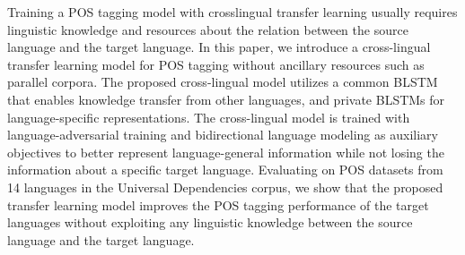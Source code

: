 Training a POS tagging model with crosslingual transfer learning usually requires linguistic knowledge and resources about the relation between the source language and the target language. In this paper, we introduce a cross-lingual transfer learning model for POS tagging without ancillary resources such as parallel corpora. The proposed cross-lingual model utilizes a common BLSTM that enables knowledge transfer from other languages, and private BLSTMs for language-specific representations. The cross-lingual model is trained with language-adversarial training and bidirectional language modeling as auxiliary objectives to better represent language-general information while not losing the information about a specific target language. Evaluating on POS datasets from 14 languages in the Universal Dependencies corpus, we show that the proposed transfer learning model improves the POS tagging performance of the target languages without exploiting any linguistic knowledge between the source language and the target language.
